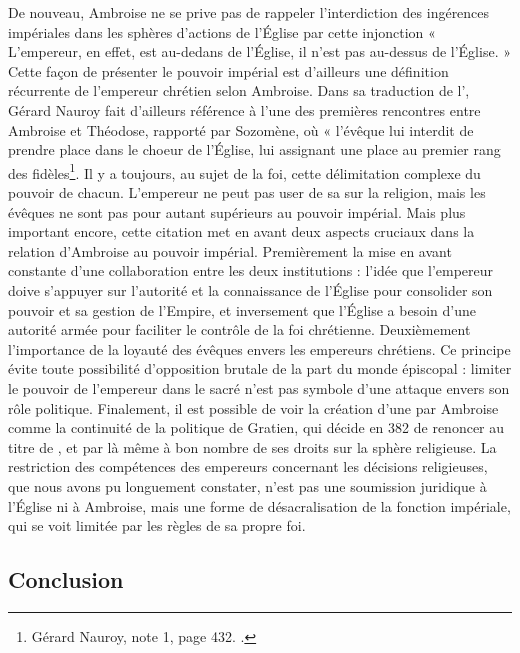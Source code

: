 De nouveau, Ambroise ne se prive pas de rappeler l'interdiction des ingérences impériales dans les sphères d'actions de l'Église par cette injonction « L'empereur, en effet, est au-dedans de l'Église, il n'est pas au-dessus de l'Église. » Cette façon de présenter le pouvoir impérial est d'ailleurs une définition récurrente de l'empereur chrétien selon Ambroise. Dans sa traduction de l', Gérard Nauroy fait d'ailleurs référence à l'une des premières rencontres entre Ambroise et Théodose, rapporté par Sozomène, où « l'évêque lui interdit de prendre place dans le choeur de l'Église, lui assignant une place au premier rang des fidèles\footnote{Gérard Nauroy, note 1, page 432. \cite[\nopp 75A,36]{ambroise_lettres}.}. Il y a toujours, au sujet de la foi, cette délimitation complexe du pouvoir de chacun. L'empereur ne peut pas user de sa  sur la religion, mais les évêques ne sont pas pour autant supérieurs au pouvoir impérial. Mais plus important encore, cette citation met en avant deux aspects cruciaux dans la relation d'Ambroise au pouvoir impérial. Premièrement la mise en avant constante d'une collaboration entre les deux institutions : l'idée que l'empereur doive s'appuyer sur l'autorité et la connaissance de l'Église pour consolider son pouvoir et sa gestion de l'Empire, et inversement que l'Église a besoin d'une autorité armée pour faciliter le contrôle de la foi chrétienne. Deuxièmement l'importance de la loyauté des évêques envers les empereurs chrétiens. Ce principe évite toute possibilité d'opposition brutale de la part du monde épiscopal : limiter le pouvoir de l'empereur dans le sacré n'est pas symbole d'une attaque envers son rôle politique. Finalement, il est possible de voir la création d'une  par Ambroise comme la continuité de la politique de Gratien, qui décide en 382 de renoncer au titre de , et par là même à bon nombre de ses droits sur la sphère religieuse. La restriction des compétences des empereurs concernant les décisions religieuses, que nous avons pu longuement constater, n'est pas une soumission juridique à l'Église ni à Ambroise, mais une forme de désacralisation de la fonction impériale, qui se voit limitée par les règles de sa propre foi.

\bigskip

\subsection*{Conclusion}

